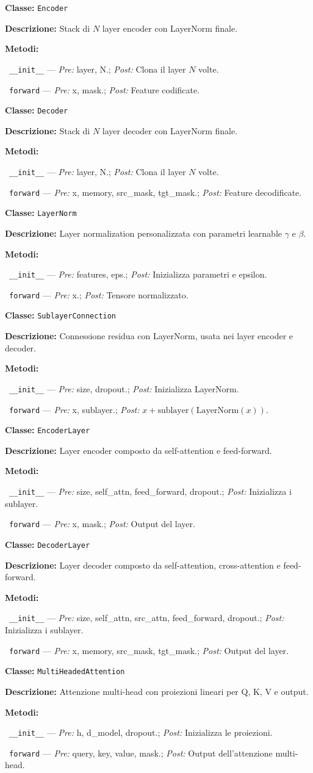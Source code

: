 \documentclass[11pt,a4paper]{article}
\newenvironment{classspec}[2]{%
    \par\medskip\noindent
    \textbf{Classe:} \texttt{#1}\par
    \textbf{Descrizione:} #2\par
    \textbf{Metodi:}\par
    \begingroup
    \setlength{\parindent}{0pt}%
    \setlength{\parskip}{2pt}%
}{%
    \endgroup
    \par\medskip
}
\newcommand{\method}[3]{%
    \noindent\hspace*{1.2em}\textbullet~\texttt{#1} --- \textit{Pre:} #2; \textit{Post:} #3\par
}
\begin{document}
\begin{classspec}{Encoder}{Stack di \(N\) layer encoder con LayerNorm finale.}
\method{\_\_init\_\_}{layer, N.}{Clona il layer \(N\) volte.}
\method{forward}{x, mask.}{Feature codificate.}
\end{classspec}

\begin{classspec}{Decoder}{Stack di \(N\) layer decoder con LayerNorm finale.}
\method{\_\_init\_\_}{layer, N.}{Clona il layer \(N\) volte.}
\method{forward}{x, memory, src\_mask, tgt\_mask.}{Feature decodificate.}
\end{classspec}

\begin{classspec}{LayerNorm}{Layer normalization personalizzata con parametri learnable \(\gamma\) e \(\beta\).}
\method{\_\_init\_\_}{features, eps.}{Inizializza parametri e epsilon.}
\method{forward}{x.}{Tensore normalizzato.}
\end{classspec}

\begin{classspec}{SublayerConnection}{Connessione residua con LayerNorm, usata nei layer encoder e decoder.}
\method{\_\_init\_\_}{size, dropout.}{Inizializza LayerNorm.}
\method{forward}{x, sublayer.}{\(x + \text{sublayer}(\text{LayerNorm}(x))\).}
\end{classspec}

\begin{classspec}{EncoderLayer}{Layer encoder composto da self-attention e feed-forward.}
\method{\_\_init\_\_}{size, self\_attn, feed\_forward, dropout.}{Inizializza i sublayer.}
\method{forward}{x, mask.}{Output del layer.}
\end{classspec}

\begin{classspec}{DecoderLayer}{Layer decoder composto da self-attention, cross-attention e feed-forward.}
\method{\_\_init\_\_}{size, self\_attn, src\_attn, feed\_forward, dropout.}{Inizializza i sublayer.}
\method{forward}{x, memory, src\_mask, tgt\_mask.}{Output del layer.}
\end{classspec}

\begin{classspec}{MultiHeadedAttention}{Attenzione multi-head con proiezioni lineari per Q, K, V e output.}
\method{\_\_init\_\_}{h, d\_model, dropout.}{Inizializza le proiezioni.}
\method{forward}{query, key, value, mask.}{Output dell'attenzione multi-head.}
\end{classspec}
\end{document}
